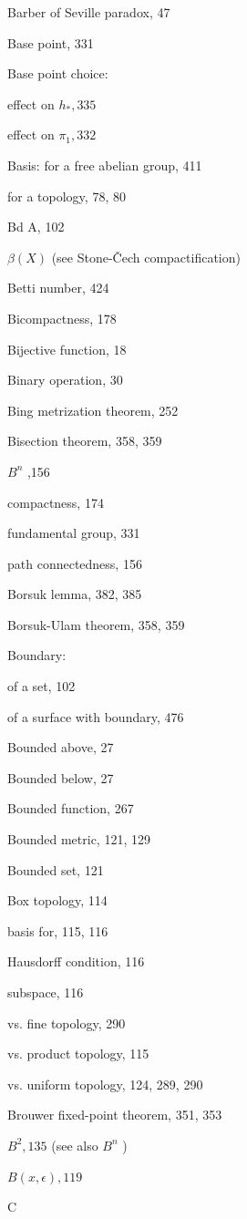 Barber of Seville paradox, 47

Base point, 331

Base point choice:

effect on \({h}_{ * },{335}\)

effect on \({\pi }_{1},{332}\)

Basis: for a free abelian group, 411

for a topology, 78, 80

Bd A, 102

\(\beta \left( X\right)\) (see Stone-Čech compactification)

Betti number, 424

Bicompactness, 178

Bijective function, 18

Binary operation, 30

Bing metrization theorem, 252

Bisection theorem, 358, 359

\({B}^{n}\) ,156

compactness, 174

fundamental group, 331

path connectedness, 156

Borsuk lemma, 382, 385

Borsuk-Ulam theorem, 358, 359

Boundary:

of a set, 102

of a surface with boundary, 476

Bounded above, 27

Bounded below, 27

Bounded function, 267

Bounded metric, 121, 129

Bounded set, 121

Box topology, 114

basis for, 115, 116

Hausdorff condition, 116

subspace, 116

vs. fine topology, 290

vs. product topology, 115

vs. uniform topology, 124, 289, 290

Brouwer fixed-point theorem, 351, 353

\({B}^{2},{135}\) (see also \({B}^{n}\) )

\(B\left( {x,\epsilon }\right) ,{119}\)

C

